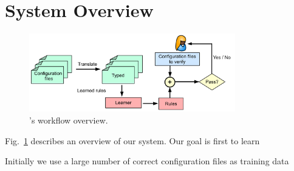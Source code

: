 \section{System Overview}
\label{sec:system}

\begin{figure}[t] \centering
\includegraphics[width=0.8\textwidth]{figs/overview}
\caption{\app's workflow overview.}
\label{fig-overview}
\end{figure}

Fig.~\ref{fig-overview} describes an overview of our system. Our goal is first to learn 

Initially
we use a large number of correct configuration files as training data 